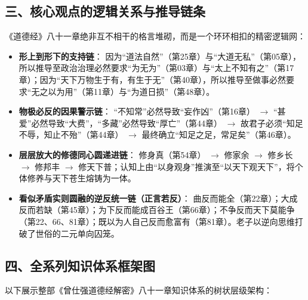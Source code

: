 \clearpage

\subsection*{三、核心观点的逻辑关系与推导链条}

《道德经》八十一章绝非互不相干的格言堆砌，而是一个环环相扣的精密逻辑网：

\begin{itemize}
    \item \textbf{形上到形下的支持链}：
    因为“道法自然”（第25章）与“大道无私”（第05章），所以推导至政治治理必然要求“为无为”（第03章）与“太上不知有之”（第17章）；因为“天下万物生于有，有生于无”（第40章），所以推导至做事必然要求“无之以为用”（第11章）与“为道日损”（第48章）。
    
    \item \textbf{物极必反的因果警示链}：
    “不知常”必然导致“妄作凶”（第16章） $\longrightarrow$ “甚爱”必然导致“大费”，“多藏”必然导致“厚亡”（第44章） $\longrightarrow$ 故君子必须“知足不辱，知止不殆”（第44章） $\longrightarrow$ 最终确立“知足之足，常足矣”（第46章）。
    
    \item \textbf{层层放大的修德同心圆递进链}：
    修身真（第54章） $\longrightarrow$ 修家余 $\longrightarrow$ 修乡长 $\longrightarrow$ 修邦丰 $\longrightarrow$ 修天下普；认知上由“以身观身”推演至“以天下观天下”，将个体修养与天下苍生熔铸为一体。
    
    \item \textbf{看似矛盾实则圆融的逆反统一链（正言若反）}：
    曲反而能全（第22章）；大成反而若缺（第45章）；为下反而能成百谷王（第66章）；不争反而天下莫能争（第22、66、81章）；既以为人自己反而愈富有（第81章）。老子以逆向思维打破了世俗的二元单向囚笼。
\end{itemize}

\clearpage

\subsection*{四、全系列知识体系框架图}

以下展示整部《曾仕强道德经解密》八十一章知识体系的树状层级架构：

